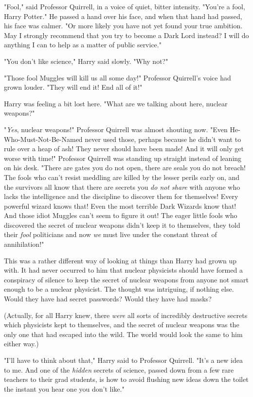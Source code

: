 "Fool," said Professor Quirrell, in a voice of quiet, bitter intensity. "You're
a fool, Harry Potter." He passed a hand over his face, and when that hand had
passed, his face was calmer. "Or more likely you have not yet found your true
ambition. May I strongly recommend that you try to become a Dark Lord instead?
I will do anything I can to help as a matter of public service."

"You don't like science," Harry said slowly. "Why not?"

"Those fool Muggles will kill us all some day!" Professor Quirrell's voice had
grown louder. "They will end it! End all of it!"

Harry was feeling a bit lost here. "What are we talking about here, nuclear
weapons?"

"\emph{Yes}, nuclear weapons!" Professor Quirrell was almost shouting now.
"Even He-Who-Must-Not-Be-Named never used those, perhaps because he didn't want
to rule over a heap of ash! They never should have been made! And it will only
get worse with time!" Professor Quirrell was standing up straight instead of
leaning on his desk. "There are gates you do not open, there are seals you do
not breach! The fools who can't resist meddling are killed by the lesser perils
early on, and the survivors all know that there are secrets you \emph{do not
share} with anyone who lacks the intelligence and the discipline to discover
them for themselves! Every powerful wizard knows that! Even the most terrible
Dark Wizards know that! And those idiot Muggles can't seem to figure it out!
The eager little fools who discovered the secret of nuclear weapons didn't keep
it to themselves, they told their \emph{fool} politicians and now \emph{we}
must live under the constant threat of annihilation!"

This was a rather different way of looking at things than Harry had grown up
with. It had never occurred to him that nuclear physicists should have formed a
conspiracy of silence to keep the secret of nuclear weapons from anyone not
smart enough to be a nuclear physicist. The thought was intriguing, if nothing
else. Would they have had secret passwords? Would they have had masks?

(Actually, for all Harry knew, there \emph{were} all sorts of incredibly
destructive secrets which physicists kept to themselves, and the secret of
nuclear weapons was the only one that had escaped into the wild. The world
would look the same to him either way.)

"I'll have to think about that," Harry said to Professor Quirrell. "It's a new
idea to me. And one of the \emph{hidden} secrets of science, passed down from a
few rare teachers to their grad students, is how to avoid flushing new ideas
down the toilet the instant you hear one you don't like."


